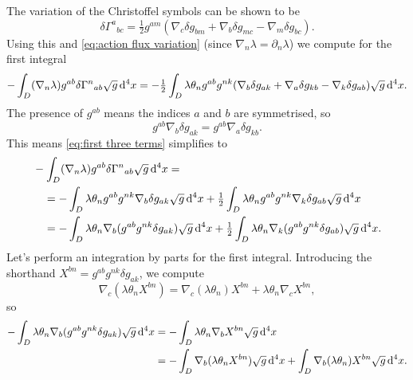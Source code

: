\documentclass[../main.tex]{subfiles}
\begin{document}
The variation of the Christoffel symbols can be shown to be
\begin{equation} \label{eq:variation christoffel symbols}
	\delta {\Gamma^a}_{bc} = \tfrac{1}{2} g^{am}(\nabla_c \delta g_{bm} + \nabla_b \delta
	g_{mc} - \nabla_m \delta g_{bc}).
\end{equation}
Using this and \cref{eq:action flux variation} (since \( \nabla_n \lambda = \partial_n
\lambda \)) we compute for the first integral
\begin{equation}\label{eq:first three terms}
	-\int_D (\nabla_n \lambda) g^{ab} \delta{\Gamma^n}_{ab} \sqrt{g} \,\mathrm{d}^4 x = -
	\tfrac{1}{2} \int_D \lambda\theta_n g^{ab} g^{nk}(\nabla_b \delta g_{ak} + \nabla_a
	\delta g_{kb} - \nabla_k \delta g_{ab}) \sqrt{g} \,\mathrm{d}^4 x. 
\end{equation}
The presence of \( g^{ab} \) means the indices \( a \) and \( b \) are symmetrised, so
\begin{equation*}
	g^{ab} \nabla_b \delta g_{ak} = g^{ab} \nabla_a \delta g_{kb}. 
\end{equation*}
This means \cref{eq:first three terms} simplifies to
\begin{align}
	&	-\int_D (\nabla_n \lambda) g^{ab} \delta{\Gamma^n}_{ab} \sqrt{g} \,\mathrm{d}^4 x = \notag \\
	& \quad = - \int_D \lambda \theta_n g^{ab}g^{nk} \nabla_b \delta g_{ak} \sqrt{g} \,\mathrm{d}^4 x
	+ \tfrac{1}{2} \int_D \lambda \theta_n g^{ab}g^{nk} \nabla_k \delta g_{ab} \sqrt{g}
	\,\mathrm{d}^4 x \notag \\
	& \quad = - \int_D \lambda \theta_n \nabla_b (g^{ab}g^{nk} \delta g_{ak}) \sqrt{g} \,\mathrm{d}^4 x
	+ \tfrac{1}{2} \int_D \lambda \theta_n \nabla_k (g^{ab}g^{nk}\delta g_{ab}) \sqrt{g}
	\,\mathrm{d}^4 x. \label{eq:two integrals}
\end{align}
Let's perform an integration by parts for the first integral. Introducing the shorthand \( X^{bn} = g^{ab}g^{nk}\delta g_{ak} \), we compute
\begin{equation*}
	\nabla_c(\lambda\theta_n X^{bn}) = \nabla_c(\lambda \theta_n)X^{bn} + \lambda \theta_n
	\nabla_c X^{bn},
\end{equation*}
so
\begin{align*}
	-\int_D \lambda \theta_n \nabla_b (g^{ab}g^{nk} \delta g_{ak})\sqrt{g}\,\mathrm{d}^4x 
	& = - \int_D \lambda \theta_n \nabla_bX^{bn} \sqrt{g} \,\mathrm{d}^4 x \\
	& = - \int_D \nabla_b(\lambda \theta_n X^{bn})\sqrt{g}\,\mathrm{d}^4x + \int_{D}
	\nabla_b(\lambda\theta_n)X^{bn}\sqrt{g}\,\mathrm{d}^4x. 
\end{align*}
\end{document}
